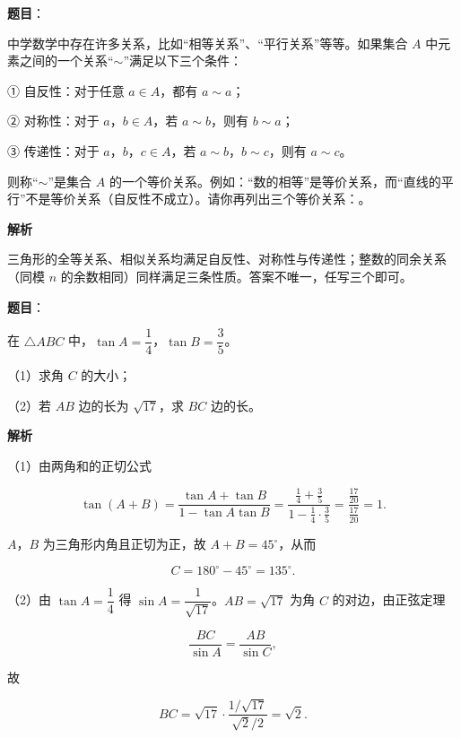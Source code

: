 \begin{answer}

\textbf{题目}：

中学数学中存在许多关系，比如“相等关系”、“平行关系”等等。如果集合 $A$ 中元素之间的一个关系“$\sim$”满足以下三个条件：

① 自反性：对于任意 $a\in A$，都有 $a\sim a$；

② 对称性：对于 $a$，$b\in A$，若 $a\sim b$，则有 $b\sim a$；

③ 传递性：对于 $a$，$b$，$c\in A$，若 $a\sim b$，$b\sim c$，则有 $a\sim c$。

则称“$\sim$”是集合 $A$ 的一个等价关系。例如：“数的相等”是等价关系，而“直线的平行”不是等价关系（自反性不成立）。请你再列出三个等价关系：\gkblank{}。

\textbf{解析}

三角形的全等关系、相似关系均满足自反性、对称性与传递性；整数的同余关系（同模 $n$ 的余数相同）同样满足三条性质。答案不唯一，任写三个即可。


\end{answer}
\begin{answer}

\textbf{题目}：

在 $\triangle ABC$ 中，$\tan A=\dfrac14$，$\tan B=\dfrac35$。

（1）求角 $C$ 的大小；

（2）若 $AB$ 边的长为 $\sqrt{17}$，求 $BC$ 边的长。

\textbf{解析}

（1）由两角和的正切公式

\nopagebreak[4]
\[\tan(A+B)=\frac{\tan A+\tan B}{1-\tan A\tan B}=\frac{\frac14+\frac35}{1-\frac14\cdot\frac35}=\frac{\frac{17}{20}}{\frac{17}{20}}=1.\]

$A$，$B$ 为三角形内角且正切为正，故 $A+B=45^\circ$，从而

\nopagebreak[4]
\[C=180^\circ-45^\circ=135^\circ.\]

（2）由 $\tan A=\dfrac14$ 得 $\sin A=\dfrac1{\sqrt{17}}$。$AB=\sqrt{17}$ 为角 $C$ 的对边，由正弦定理

\nopagebreak[4]
\[\frac{BC}{\sin A}=\frac{AB}{\sin C},\]

故

\nopagebreak[4]
\[BC=\sqrt{17}\cdot\frac{1/\sqrt{17}}{\sqrt2/2}=\sqrt2.\]


\end{answer}
